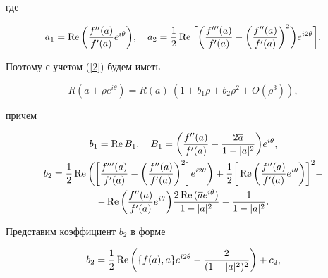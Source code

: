 где


$$


a_1=\re \bigg(\frac{f''(a)}{f'(a)}e^{i\theta}\bigg),\quad


a_2=\frac{1}{2}\re\bigg[ \bigg(


\frac{f'''(a)}{f'(a)}-\bigg(\frac{{f''}(a)}{{f'}(a)}\bigg)^2


\bigg)e^{i2\theta}\bigg].


$$


Поэтому с учетом (\ref{2}) будем иметь


\begin{equation}\label{3}


R(a+\rho e^{i\theta})=R(a)\:(1+b_1\rho+b_2\rho^2+O(\rho^3)),


\end{equation}


причем


\begin{gather}\label{4}


b_1=\re B_1,\quad B_1=\bigg( \frac{f''(a)}{f'(a)}-


\frac{2\overline{a}}{1-|a|^2} \bigg) e^{i\theta},\\


%


b_2=\frac{1}{2}\re\bigg(\bigg[


\frac{f'''(a)}{f'(a)}-\bigg(\frac{{f''}(a)}{{f'}(a)}\bigg)^2


\bigg]e^{i2\theta}\bigg)


+\frac{1}{2} \bigg[ \re\bigg(\frac{f''(a)}{f'(a)}e^{i\theta}\bigg)


\bigg]^2 - \notag \\


%


-\re\bigg(\frac{f''(a)}{f'(a)}e^{i\theta}\bigg)


\frac{2\re{(\overline{a}e^{i\theta})}}{1-|a|^2} -\frac{1}{1-|a|^2}.\notag


\end{gather}





Представим коэффициент $b_2$ в форме


\begin{equation}\label{5}


b_2=\frac12 \re\bigg(\{f(a),a


\}e^{i2\theta}-\frac{2}{(1-|a|^2)^2}\bigg)+c_2,


\end{equation}



